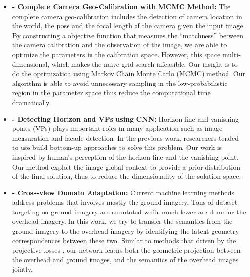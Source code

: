 \begin{itemize}[noitemsep]

  \item \textbf{ - 
  Complete Camera Geo-Calibration with MCMC Method:} \newline \newline
  The complete camera geo-calibration includes the detection of camera
  location in the world, the pose and the focal length of the camera
  given the input image. By constructing a objective function that
  measures the ``matchness'' between the camera calibration and the
  observation of the image, we are able to optimize the parameters in
  the calibration space. However, this space multi-dimensional, which
  makes the naive grid search infeasible. Our insight is to do the
  optimization using Markov Chain Monte Carlo (MCMC) method. Our
  algorithm is able to avoid unnecessary sampling in the
  low-probabilistic region in the parameter space thus reduce the
  computational time dramatically. \newline

  \item \textbf{ -
  Detecting Horizon and VPs using CNN:} \newline \newline
  Horizon line and vanishing points (VPs) plays important roles in many
  application such as image mensuration and facade detection. In the
  previous work, researchers tended to use build bottom-up approaches to
  solve this problem. Our work is inspired by human's perception of the
  horizon line and the vanishing point. Our method exploit the image
  global context to provide a prior distribution of the final solution,
  thus to reduce the dimensionality of the solution space. \newline

  \item \textbf{ -
  Cross-view Domain Adaptation:} \newline \newline
  Current machine learning methods address problems that involves mostly
  the ground imagery. Tons of dataset targeting on ground imagery are
  annotated while much fewer are done for the overhead imagery.
  In this work, we try to transfer the semantics from the ground imagery
  to the overhead imagery by identifying the latent geometry
  correspondences between these two. Similar to methods that driven by
  the projective losses , our network learns 
  both the geometric projection between the overhead and ground
  images, and the semantics of the overhead images jointly. \newline


\end{itemize}
